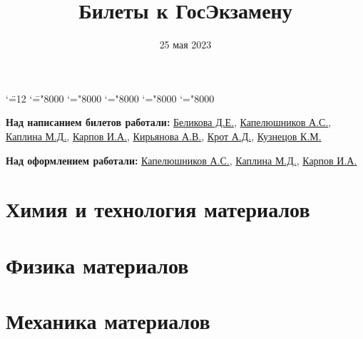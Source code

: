 \documentclass[a4paper, 12pt, openany, twoside]{book} %
\begin{document}

\begingroup \catcode`\"=12
\gdef\newmcodes@{\mathcode`\'39\mathcode`\*42\mathcode`\."613A%
\mathcode`\-"8000\mathcode`\/47\mathcode`\:"603A\relax}%
\endgroup
\mathcode`\=="8000 \mathcode`\+="8000 \mathcode`\-="8000
\mathcode`\<="8000 \mathcode`\>="8000

\graphicspath{{images/}}

\title{Билеты к ГосЭкзамену}
\date{25 мая 2023}

\maketitle

\pagebreak
\hspace{0pt}
\vfill
\begin{center}
    \textbf{Над написанием билетов работали:} \href{https://vk.com/daria_belikovaa}{Беликова Д.Е.}, \href{https://vk.com/a.kapelushnikov}{Капелюшников А.С.}, \href{https://vk.com/mashkaplina}{Каплина М.Д.}, \href{https://vk.com/karpovivan2}{Карпов И.А.}, \href{https://vk.com/id113521669}{Кирьянова А.В.}, \href{https://vk.com/annadkrot}{Крот А.Д.}, \href{https://vk.com/kir_kuzya}{Кузнецов К.М.}

    \textbf{Над оформлением работали:} \href{https://vk.com/a.kapelushnikov}{Капелюшников А.С.}, \href{https://vk.com/mashkaplina}{Каплина М.Д.}, \href{https://vk.com/karpovivan2}{Карпов И.А.}
\end{center}

\vfill
\hspace{0pt}
\pagebreak

\tableofcontents

%
\chapter{Химия и технология материалов}





\chapter{Физика материалов}









\chapter{Механика материалов}



\end{document}

